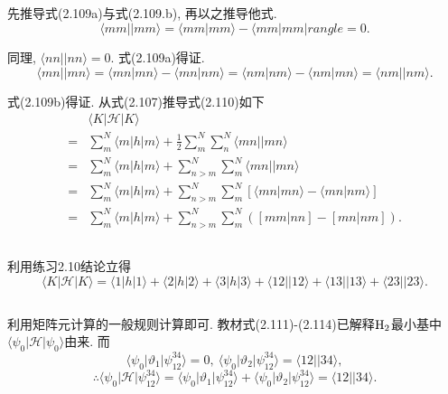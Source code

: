 \documentclass[UTF8]{ctexart}
\begin{document}
	\subsection{}
		先推导式(2.109a)与式(2.109.b), 再以之推导他式. 
		\[
			\langle mm || mm \rangle = \langle mm | mm \rangle - \langle mm | mm |rangle = 0.
		\]
		
		同理, $\langle nn || nn \rangle = 0$. 式(2.109a)得证. 
		\[
			\langle mn || mn \rangle = \langle mn | mn \rangle - \langle mn | nm \rangle = \langle nm | nm \rangle - \langle nm | mn \rangle = \langle nm || nm \rangle.
		\]
		
		式(2.109b)得证. 从式(2.107)推导式(2.110)如下
		\[
		\begin{aligned}
			&\langle K | \mathscr{H} | K \rangle \\
			=& \sum_m^N \langle m | h | m \rangle + \frac{1}{2} \sum_m^N \sum_n^N \langle mn || mn \rangle \\
			=& \sum_m^N \langle m | h | m \rangle + \sum_{n > m}^N \sum_m^N \langle mn || mn \rangle \\
			=& \sum_m^N \langle m | h | m \rangle + \sum_{n > m}^N \sum_m^N [ \langle mn | mn \rangle - \langle mn | nm \rangle ] \\
			=& \sum_m^N \langle m | h | m \rangle + \sum_{n > m}^N \sum_m^N ( [mm | nn] - [mn | nm] ).
		\end{aligned}
		\]
	
	\subsection{}
		利用练习2.10结论立得
		\[
			\langle K | \mathscr{H} | K \rangle = \langle 1 | h | 1 \rangle + \langle 2 | h | 2 \rangle + \langle 3 | h | 3 \rangle + \langle 12 || 12 \rangle + \langle 13 || 13 \rangle + \langle 23 || 23 \rangle.
		\]
	
	\subsection{}
		利用矩阵元计算的一般规则计算即可. 教材式(2.111)-(2.114)已解释$\rm H_2$最小基中$\langle \psi_0 | \mathscr{H} | \psi_0 \rangle$由来. 而
		\[
			\langle \psi_0 | \vartheta_1 | \psi_{12}^{34} \rangle = 0, \ \langle \psi_0 | \vartheta_2 | \psi_{12}^{34} \rangle = \langle 12 || 34 \rangle,
		\]
		\[
			\therefore \langle \psi_0 | \mathscr{H} | \psi_{12}^{34} \rangle = \langle \psi_0 | \vartheta_1 | \psi_{12}^{34} \rangle + \langle \psi_0 | \vartheta_2 | \psi_{12}^{34} \rangle = \langle 12 || 34 \rangle .
		\]
		
\end{document}
